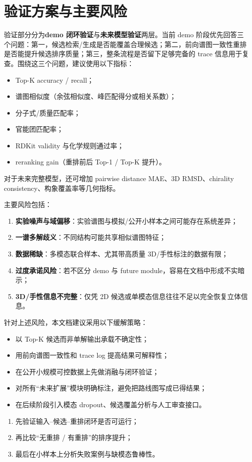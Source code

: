 \section{验证方案与主要风险}
验证部分分为\textbf{demo 闭环验证}与\textbf{未来模型验证}两层。当前 demo 阶段优先回答三个问题：第一，候选检索/生成是否能覆盖合理候选；第二，前向谱图一致性重排是否能提升候选排序质量；第三，整条流程是否留下足够完备的 trace 信息用于复查。围绕这三个问题，建议使用以下指标：
\begin{itemize}
  \item Top-K accuracy / recall；
  \item 谱图相似度（余弦相似度、峰匹配得分或相关系数）；
  \item 分子式/质量匹配率；
  \item 官能团匹配率；
  \item RDKit validity 与化学规则通过率；
  \item reranking gain（重排前后 Top-1 / Top-K 提升）。
\end{itemize}
对于未来完整模型，还可增加 pairwise distance MAE、3D RMSD、chirality consistency、构象覆盖率等几何指标。

主要风险包括：
\begin{enumerate}
  \item \textbf{实验噪声与域偏移}：实验谱图与模拟/公开小样本之间可能存在系统差异；
  \item \textbf{一谱多解歧义}：不同结构可能共享相似谱图特征；
  \item \textbf{数据稀缺}：多模态联合样本、尤其带高质量 3D/手性标注的数据有限；
  \item \textbf{过度承诺风险}：若不区分 demo 与 future module，容易在文档中形成不实暗示；
  \item \textbf{3D/手性信息不完整}：仅凭 2D 候选或单模态信息往往不足以完全恢复立体信息。
\end{enumerate}

针对上述风险，本文档建议采用以下缓解策略：
\begin{itemize}
  \item 以 Top-K 候选而非单解输出承载不确定性；
  \item 用前向谱图一致性和 trace log 提高结果可解释性；
  \item 在公开小规模可控数据上先做消融与闭环验证；
  \item 对所有“未来扩展”模块明确标注，避免把路线图写成已得结果；
  \item 在后续阶段引入模态 dropout、候选覆盖分析与人工审查接口。
\end{itemize}

\begin{keybox}[推荐验证顺序]
\begin{enumerate}
  \item 先验证输入--候选--重排闭环是否可运行；
  \item 再比较“无重排 / 有重排”的排序提升；
  \item 最后在小样本上分析失败案例与缺模态鲁棒性。
\end{enumerate}
\end{keybox}
